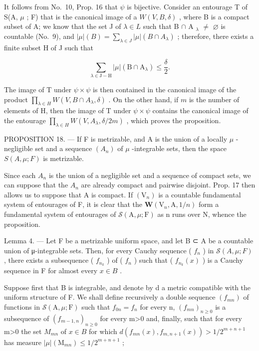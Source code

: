 It follows from No.~10, Prop. 16 that \(\psi\) is bijective. Consider an entourage T of S(A, \(\mu\) ; F) that is the canonical image of a \(W(V, B, \delta)\) , where B is a compact subset of A; we know that the set J of \(\lambda \in L\) such that B \(\cap\) A \(_{\lambda}\) \(\neq\) \(\varnothing\) is countable (No.~9), and \(|\mu|(B) = \sum_{\lambda \in J} |\mu|(B \cap A_{\lambda})\) ; therefore, there exists a finite subset H of J such that

\[
\sum_ {\lambda \in \mathrm{J} - \mathrm{H}} | \mu | (\mathrm{B} \cap \mathrm{A} _ {\lambda}) \leqslant \frac {\delta}{2}.
\]

The image of T under \(\psi \times \psi\) is then contained in the canonical image of the product \(\prod_{\lambda \in H} W(V, B \cap A_{\lambda}, \delta)\) . On the other hand, if \(m\) is the number of elements of H, then the image of T under \(\psi \times \psi\) contains the canonical image of the entourage \(\prod_{\lambda \in H} W(V, A_{\lambda}, \delta / 2m)\) , which proves the proposition.

PROPOSITION 18. --- If F is metrizable, and A is the union of a locally \(\mu\) -negligible set and a sequence \((A_{n})\) of \(\mu\) -integrable sets, then the space \(S(A,\mu;F)\) is metrizable.

Since each \(A_{n}\) is the union of a negligible set and a sequence of compact sets, we can suppose that the \(A_{n}\) are already compact and pairwise disjoint. Prop. 17 then allows us to suppose that A is compact. If \((\mathrm{V}_{n})\) is a countable fundamental system of entourages of F, it is clear that the \(\boldsymbol{W}(\mathrm{V}_{n},\mathrm{A},1/n)\) form a fundamental system of entourages of \(\mathcal{S}(\mathrm{A},\mu;\mathrm{F})\) as n runs over N, whence the proposition.

Lemma 4. --- Let F be a metrizable uniform space, and let B ⊂ A be a countable union of μ-integrable sets. Then, for every Cauchy sequence ( \(f_{n}\) ) in \(\mathcal{S}(A,\mu;F)\) , there exists a subsequence ( \(f_{n_{k}}\) ) of ( \(f_{n}\) ) such that ( \(f_{n_{k}}(x)\) ) is a Cauchy sequence in F for almost every \(x \in B\) .

Suppose first that B is integrable, and denote by d a metric compatible with the uniform structure of F. We shall define recursively a double sequence \((f_{mn})\) of functions in \(\mathcal{S}(\mathrm{A},\mu;\mathrm{F})\) such that \(f_{0n}=f_{n}\) for every n, \((f_{mn})_{n\geqslant0}\) is a subsequence of \((f_{m-1,n})_{n\geqslant0}\) for every m\textgreater0 and, finally, such that for every m\textgreater0 the set \(M_{mn}\) of \(x\in B\) for which \(d(f_{mn}(x),f_{m,n+1}(x))>1/2^{m+n+1}\) has measure \(|\mu|(\mathrm{M}_{mn})\leqslant1/2^{m+n+1}\) ;

